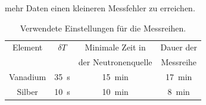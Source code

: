 mehr Daten einen kleineren Messfehler zu erreichen.
\begin{table}%
    \centering
    \begin{tabular}{c c c c}%
        \toprule%
        Element  & $\delta T$ & Minimale Zeit in       & Dauer der\\%
                 &            & der Neutronenquelle    & Messreihe\\%
        \midrule        %
        Vanadium & \qty{35}{\s}   &  \qty{15}{\minute} & \qty{17}{\minute}\\%
        Silber   & \qty{10}{\s}   &  \qty{10}{\minute} & \qty{8}{\minute}\\%
    \end{tabular}%
    \caption{Verwendete Einstellungen für die Messreihen.}%
    \label{tab:zeiten}%
\end{table}%
